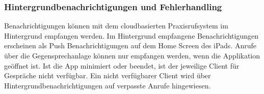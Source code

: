 \clearpage

\subsubsection*{Hintergrundbenachrichtigungen und Fehlerhandling}

Benachrichtigungen können mit dem cloudbasierten Praxisrufsystem im Hintergrund empfangen werden.
Im Hintergrund empfangene Benachrichtigungen erscheinen als Push Benachrichtigungen auf dem Home Screen des iPads.
Anrufe über die Gegensprechanlage können nur empfangen werden, wenn die Applikation geöffnet ist.
Ist die App minimiert oder beendet, ist der jeweilige Client für Gespräche nicht verfügbar.
Ein nicht verfügbarer Client wird über Hintergrundbenachrichtigungen auf verpasste Anrufe hingewiesen.

